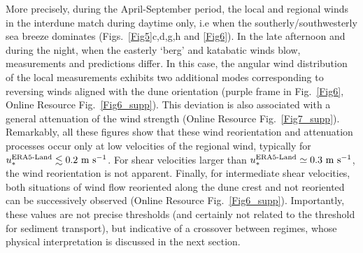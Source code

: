 More precisely, during the April-September period, the local and regional winds in the interdune match during daytime only, i.e when the southerly/southwesterly sea breeze dominates (Figs.~\ref{Fig5}c,d,g,h and \ref{Fig6}). In the late afternoon and during the night, when the easterly `berg' and katabatic winds blow, measurements and predictions differ. In this case, the angular wind distribution of the local measurements exhibits two additional modes corresponding to reversing winds aligned with the dune orientation (purple frame in Fig.~\ref{Fig6}, Online Resource Fig.~\ref{Fig6_supp}). This deviation is also associated with a general attenuation of the wind strength (Online Resource Fig.~\ref{Fig7_supp}). Remarkably, all these figures show that these wind reorientation and attenuation processes occur only at low velocities of the regional wind, typically for $u_{*}^{\textup{ERA5-Land}} \lesssim 0.2~\textrm{m}~\textrm{s}^{-1}$. For shear velocities larger than $u_{*}^{\textup{ERA5-Land}} \simeq 0.3~\textrm{m}~\textrm{s}^{-1}$, the wind reorientation is not apparent. Finally, for intermediate shear velocities, both situations of wind flow reoriented along the dune crest and not reoriented can be successively observed (Online Resource Fig.~\ref{Fig6_supp}). Importantly, these values are not precise thresholds (and certainly not related to the threshold for sediment transport), but indicative of a crossover between regimes, whose physical interpretation is discussed in the next section.


